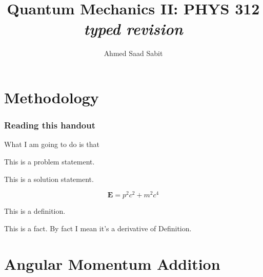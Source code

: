 \documentclass[10pt]{article}
\renewcommand{\vec}{\mathbf}
\renewcommand{\vec}{\mathbf}
\begin{document}
	\title{{Quantum Mechanics II: PHYS 312}\\{\normalsize{\itshape 
				typed revision
	}}}
	\author{Ahmed Saad Sabit}
	\maketitle
	\newpage
	\pagestyle{fancynotes}

\part{Methodology}
\section{Reading this handout} 
What I am going to do is that
\begin{prob}
	This is a problem statement.
\end{prob}
\begin{solu}
	This is a solution statement. 
\end{solu}
\begin{margintable}
	\[
	\vec{E} = p^2 c^2 + m^2 c^{4}
	\] 
\end{margintable}
\begin{definition}
	This is a definition. 
\end{definition}
\begin{fact}
This is a fact. By fact I mean it's a derivative of Definition.
\end{fact}



\newpage

\part{Angular Momentum Addition}
\end{document}
